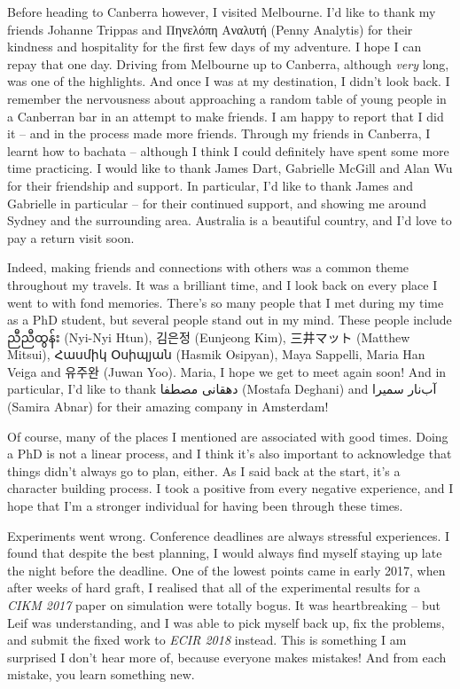 \begin{preamble}
Before heading to Canberra however, I visited Melbourne. I'd like to thank my friends Johanne Trippas and Πηνελόπη Αναλυτή (Penny Analytis) for their kindness and hospitality for the first few days of my adventure. I hope I can repay that one day. Driving from Melbourne up to Canberra, although \emph{very} long, was one of the highlights. And once I was at my destination, I didn't look back. I remember the nervousness about approaching a random table of young people in a Canberran bar in an attempt to make friends. I am happy to report that I did it -- and in the process made more friends. Through my friends in Canberra, I learnt how to bachata -- although I think I could definitely have spent some more time practicing. I would like to thank James Dart, Gabrielle McGill and Alan Wu for their friendship and support. In particular, I'd like to thank James and Gabrielle in particular -- for their continued support, and showing me around Sydney and the surrounding area. Australia is a beautiful country, and I'd love to pay a return visit soon.

Indeed, making friends and connections with others was a common theme throughout my travels. It was a brilliant time, and I look back on every place I went to with fond memories. There's so many people that I met during my time as a PhD student, but several people stand out in my mind. These people include {\burmesefont ညီညီထွန်း} (Nyi-Nyi Htun), {\asianfont 김은정} (Eunjeong Kim), {\asianfont 三井マット} (Matthew Mitsui), {\armenianfont Հասմիկ Օսիպյան} (Hasmik Osipyan), Maya Sappelli, Maria Han Veiga and {\asianfont 유주완} (Juwan Yoo). Maria, I hope we get to meet again soon! And in particular, I'd like to thank {\farsifont دهقانی مصطفا} (Mostafa Deghani) and {\farsifont آب‌نار سمیرا} (Samira Abnar) for their amazing company in Amsterdam!

Of course, many of the places I mentioned are associated with good times. Doing a PhD is not a linear process, and I think it's also important to acknowledge that things didn't always go to plan, either. As I said back at the start, it's a character building process. I took a positive from every negative experience, and I hope that I'm a stronger individual for having been through these times.

Experiments went wrong. Conference deadlines are always stressful experiences. I found that despite the best planning, I would always find myself staying up late the night before the deadline. One of the lowest points came in early 2017, when after weeks of hard graft, I realised that all of the experimental results for a \emph{CIKM 2017} paper on simulation were totally bogus. It was heartbreaking -- but Leif was understanding, and I was able to pick myself back up, fix the problems, and submit the fixed work to \emph{ECIR 2018} instead. This is something I am surprised I don't hear more of, because everyone makes mistakes! And from each mistake, you learn something new.


\end{preamble}

